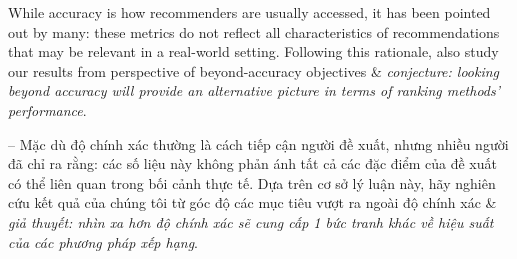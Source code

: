 \documentclass{article}
\begin{document}
\begin{itemize}
    While accuracy is how recommenders are usually accessed, it has been pointed out by many: these metrics do not reflect all characteristics of recommendations that may be relevant in a real-world setting. Following this rationale, also study our results from perspective of beyond-accuracy objectives \& {\it conjecture: looking beyond accuracy will provide an alternative picture in terms of ranking methods' performance}.

    -- Mặc dù độ chính xác thường là cách tiếp cận người đề xuất, nhưng nhiều người đã chỉ ra rằng: các số liệu này không phản ánh tất cả các đặc điểm của đề xuất có thể liên quan trong bối cảnh thực tế. Dựa trên cơ sở lý luận này, hãy nghiên cứu kết quả của chúng tôi từ góc độ các mục tiêu vượt ra ngoài độ chính xác \& {\it giả thuyết: nhìn xa hơn độ chính xác sẽ cung cấp 1 bức tranh khác về hiệu suất của các phương pháp xếp hạng}.


\end{itemize}
\end{document}
